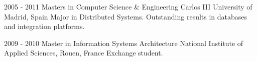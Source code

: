 
\begin{rlist}
  \item 
    \education
      {2005 - 2011}
      {Masters in Computer Science \& Engineering}
      {Carlos III University of Madrid, Spain}
      {Major in Distributed Systems. Outstanding results in databases and integration platforms.}
  \item 
    \education
      {2009 - 2010}
      {Master in Information Systems Architecture}
      {National Institute of Applied Sciences, Rouen, France}
      {Exchange student.} 
\end{rlist}

